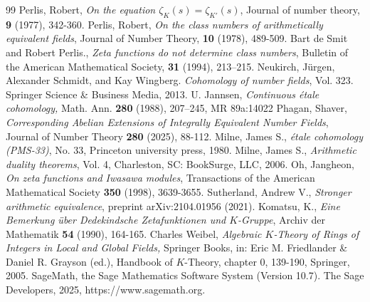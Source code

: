 \documentclass{article}
\numberwithin{equation}{section} %
\begin{document}
\begin{thebibliography}{99}
         Perlis, Robert, \textit{On the equation $\zeta_{K}(s)= \zeta_{K'}(s)$}, Journal of number theory, \textbf{9} (1977), 342-360.
         Perlis, Robert, \textit{On the class numbers of arithmetically equivalent fields}, Journal of Number Theory, \textbf{10} (1978), 489-509.
         Bart de Smit and Robert Perlis., \textit{Zeta functions do not determine class numbers}, Bulletin of the American Mathematical Society, \textbf{31} (1994), 213–215.
         Neukirch, Jürgen, Alexander Schmidt, and Kay Wingberg. \textit{Cohomology of number fields}, Vol. 323. Springer Science \& Business Media, 2013.
         U. Jannsen, \textit{Continuous \'{e}tale cohomology,} Math. Ann. \textbf{280} (1988), 207–245, MR 89a:14022
         Phagan, Shaver, \textit{Corresponding Abelian Extensions of Integrally Equivalent Number Fields}, Journal of Number Theory \textbf{280} (2025), 88-112.
         Milne, James S., \textit{\'{e}tale cohomology (PMS-33)}, No. 33, Princeton university press, 1980.
         Milne, James S., \textit{Arithmetic duality theorems}, Vol. 4, Charleston, SC: BookSurge, LLC, 2006.
         Oh, Jangheon, \textit{On zeta functions and Iwasawa modules}, Transactions of the American Mathematical Society \textbf{350} (1998), 3639-3655.
         Sutherland, Andrew V., \textit{Stronger arithmetic equivalence}, preprint arXiv:2104.01956 (2021).
         Komatsu, K., \textit{Eine Bemerkung über Dedekindsche Zetafunktionen und $K$-Gruppe}, Archiv der Mathematik \textbf{54} (1990), 164-165.
         Charles Weibel, \textit{Algebraic $K$-Theory of Rings of Integers in Local and Global Fields,} Springer Books, in: Eric M. Friedlander \& Daniel R. Grayson (ed.), Handbook of $K$-Theory, chapter 0, 139-190, Springer, 2005.
         SageMath, the Sage Mathematics Software System (Version 10.7). The Sage Developers, 2025, https://www.sagemath.org.
    \end{thebibliography}
\end{document}
